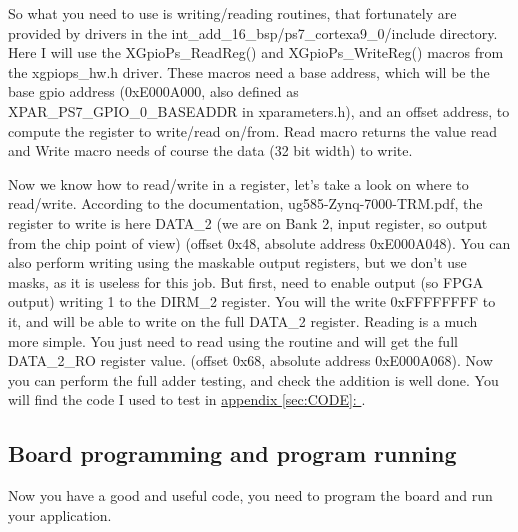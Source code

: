 \documentclass{article}
\begin{document}
		So what you need to use is writing/reading routines, that fortunately
		are provided by drivers in the
		int\_add\_16\_bsp/ps7\_cortexa9\_0/include directory. Here I will use
		the XGpioPs\_ReadReg() and XGpioPs\_WriteReg() macros from the xgpiops\_hw.h
		driver. These macros need a base address, which will be the base gpio
		address (0xE000A000, also defined as XPAR\_PS7\_GPIO\_0\_BASEADDR in
				xparameters.h), and an offset address, to compute the register to
		write/read on/from. Read macro returns the value read and Write macro
		needs of course the data (32 bit width) to write.

		Now we know how to read/write in a register, let's take a look on where
		to read/write. According to the documentation, ug585-Zynq-7000-TRM.pdf,
		the register to write is here DATA\_2 (we are on Bank 2, input register,
				so output from the chip point of view) (offset 0x48, absolute
					address 0xE000A048). You can also perform writing using the
				maskable output registers, but we don't use masks, as it is
				useless for this job. But first, need to enable output 
				(so FPGA output) writing 1 to the DIRM\_2 register. You will the
				write 0xFFFFFFFF to it, and will be able to write on the full
				DATA\_2 register.
				Reading is a much more simple. You just need to read using the
				routine and will get the full DATA\_2\_RO register value. (offset 0x68, absolute address
						0xE000A068).
		Now you can perform the full adder testing, and check the addition is
		well done. You will find the code I used to test in
		\hyperref[sec:CODE]{ appendix \ref{sec:CODE}:  }.
	\subsection{Board programming and program running}
	Now you have a good and useful code, you need to program the board and run
	your application.
\end{document}
